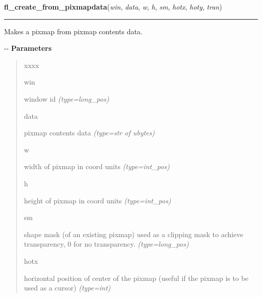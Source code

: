     \label{xformslib:flbitmap:fl_create_from_pixmapdata}

    \vspace{0.5ex}

\hspace{.8\funcindent}\begin{boxedminipage}{\funcwidth}

    \raggedright \textbf{fl\_create\_from\_pixmapdata}(\textit{win}, \textit{data}, \textit{w}, \textit{h}, \textit{sm}, \textit{hotx}, \textit{hoty}, \textit{tran})

    \vspace{-1.5ex}

    \rule{\textwidth}{0.5\fboxrule}
\setlength{\parskip}{2ex}

Makes a pixmap from pixmap contents data.

-{}-
\setlength{\parskip}{1ex}
      \textbf{Parameters}
      \vspace{-1ex}

      \begin{quote}
        \begin{Ventry}{xxxx}

          \item[win]


window id
            {\it (type=long\_pos)}

          \item[data]


pixmap contents data
            {\it (type=str of ubytes)}

          \item[w]


width of pixmap in coord units
            {\it (type=int\_pos)}

          \item[h]


height of pixmap in coord units
            {\it (type=int\_pos)}

          \item[sm]


shape mask (of an existing pixmap) used as a clipping mask to
achieve transparency, 0 for no transparency.
            {\it (type=long\_pos)}

          \item[hotx]


horizontal position of center of the pixmap (useful if the pixmap is
to be used as a cursor)
            {\it (type=int)}


\end{Ventry}
\end{quote}
\end{boxedminipage}
